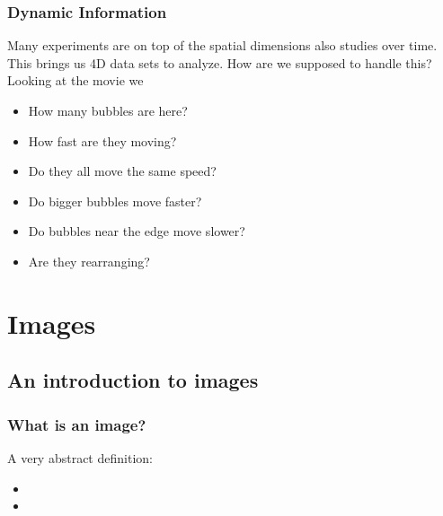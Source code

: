 \documentclass[letterpaper,10pt,english]{sphinxmanual}
\begin{document}
\subsection{Dynamic Information}
\label{\detokenize{01-Introduction:dynamic-information}}
\sphinxAtStartPar
Many experiments are on top of the spatial dimensions also studies over time. This brings us 4D data sets to analyze. How are we supposed to handle this? Looking at the movie we
\begin{itemize}
\item {} 
\sphinxAtStartPar
How many bubbles are here?

\item {} 
\sphinxAtStartPar
How fast are they moving?

\item {} 
\sphinxAtStartPar
Do they all move the same speed?

\item {} 
\sphinxAtStartPar
Do bigger bubbles move faster?

\item {} 
\sphinxAtStartPar
Do bubbles near the edge move slower?

\item {} 
\sphinxAtStartPar
Are they rearranging?

\end{itemize}

\sphinxAtStartPar



\chapter{Images}
\label{\detokenize{01-Introduction:images}}

\section{An introduction to images}
\label{\detokenize{01-Introduction:an-introduction-to-images}}

\subsection{What is an image?}
\label{\detokenize{01-Introduction:what-is-an-image}}
\sphinxAtStartPar
A very abstract definition:
\begin{itemize}
\item {} 
\sphinxAtStartPar
{}

\item {} 
\sphinxAtStartPar
{}

\end{itemize}
\end{document}
